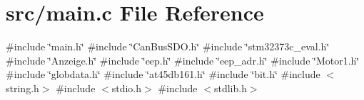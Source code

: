 \section{src/main.c File Reference}
\label{main_8c}
{\ttfamily \#include \char`\"{}main.\+h\char`\"{}}\newline
{\ttfamily \#include \char`\"{}Can\+Bus\+S\+D\+O.\+h\char`\"{}}\newline
{\ttfamily \#include \char`\"{}stm32373c\+\_\+eval.\+h\char`\"{}}\newline
{\ttfamily \#include \char`\"{}Anzeige.\+h\char`\"{}}\newline
{\ttfamily \#include \char`\"{}eep.\+h\char`\"{}}\newline
{\ttfamily \#include \char`\"{}eep\+\_\+adr.\+h\char`\"{}}\newline
{\ttfamily \#include \char`\"{}Motor1.\+h\char`\"{}}\newline
{\ttfamily \#include \char`\"{}globdata.\+h\char`\"{}}\newline
{\ttfamily \#include \char`\"{}at45db161.\+h\char`\"{}}\newline
{\ttfamily \#include \char`\"{}bit.\+h\char`\"{}}\newline
{\ttfamily \#include $<$string.\+h$>$}\newline
{\ttfamily \#include $<$stdio.\+h$>$}\newline
{\ttfamily \#include $<$stdlib.\+h$>$}\newline
